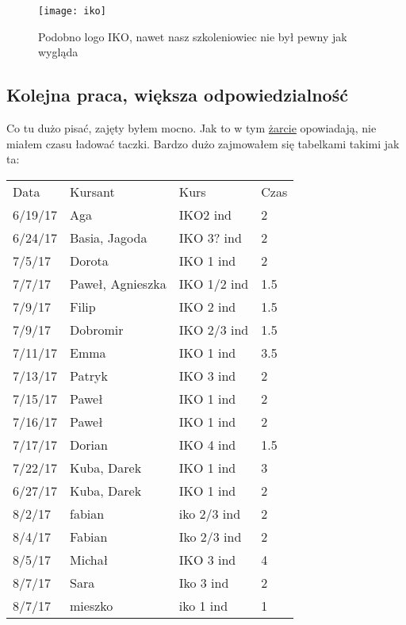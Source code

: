 \documentclass{article}
\begin{document}
	\begin{figure}[h]
			\centering
			\texttt{[image: iko]}
			\caption{Podobno logo IKO, nawet nasz szkoleniowiec nie był pewny jak wygląda}
		\end{figure}
	
	\subsection{Kolejna praca, większa odpowiedzialność}
	Co tu dużo pisać, zajęty byłem mocno. Jak to w tym \href{https://www.computerworld.pl/felieton/Pusta-taczka,298952.html}{żarcie} opowiadają, nie miałem czasu ładować taczki. Bardzo dużo zajmowałem się tabelkami takimi jak ta:
	
	
	\begin{table}[!ht]
		\centering
		\begin{tabular}{llll}
Data    & Kursant          & Kurs         & Czas  \\
6/19/17 & Aga              & IKO2 ind     & 2     \\
6/24/17 & Basia, Jagoda    & IKO 3? ind   & 2     \\
7/5/17  & Dorota           & IKO 1 ind    & 2     \\
7/7/17  & Paweł, Agnieszka & IKO 1/2 ind  & 1.5   \\
7/9/17  & Filip            & IKO 2 ind    & 1.5   \\
7/9/17  & Dobromir         & IKO 2/3 ind  & 1.5   \\
7/11/17 & Emma             & IKO 1 ind    & 3.5   \\
7/13/17 & Patryk           & IKO 3 ind    & 2     \\
7/15/17 & Paweł            & IKO 1 ind    & 2     \\
7/16/17 & Paweł            & IKO 1 ind    & 2     \\
7/17/17 & Dorian           & IKO 4 ind    & 1.5   \\
7/22/17 & Kuba, Darek      & IKO 1 ind    & 3     \\
6/27/17 & Kuba, Darek      & IKO 1 ind    & 2     \\
8/2/17  & fabian           & iko 2/3 ind  & 2     \\
8/4/17  & Fabian           & Iko 2/3 ind  & 2     \\
8/5/17  & Michał           & IKO 3 ind    & 4     \\
8/7/17  & Sara             & Iko 3 ind    & 2     \\
8/7/17  & mieszko          & iko 1 ind    & 1     \\

\end{tabular}
\end{table}
\end{document}
